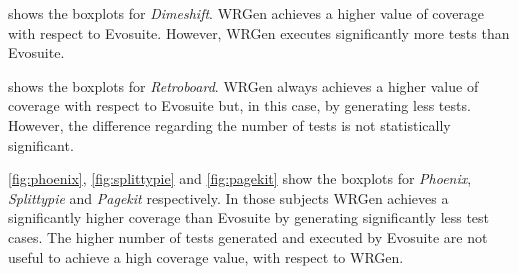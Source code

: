 
 shows the boxplots for \textit{Dimeshift}. WRGen achieves a higher value of coverage with respect to Evosuite. However, WRGen executes significantly more tests than Evosuite.

 shows the boxplots for \textit{Retroboard}. WRGen always achieves a higher value of coverage with respect to Evosuite but, in this case, by generating less tests. However, the difference regarding the number of tests is not statistically significant.



\begin{figure}[H]
	\centering
	
	
\end{figure}
\begin{figure}[H]
	\centering
	
\end{figure}

\autoref{fig:phoenix}, \autoref{fig:splittypie} and \autoref{fig:pagekit} show the boxplots for \textit{Phoenix}, \textit{Splittypie} and \textit{Pagekit} respectively. In those subjects WRGen achieves a significantly higher coverage than Evosuite by generating significantly less test cases. The higher number of tests generated and executed by Evosuite are not useful to achieve a high coverage value, with respect to WRGen.

